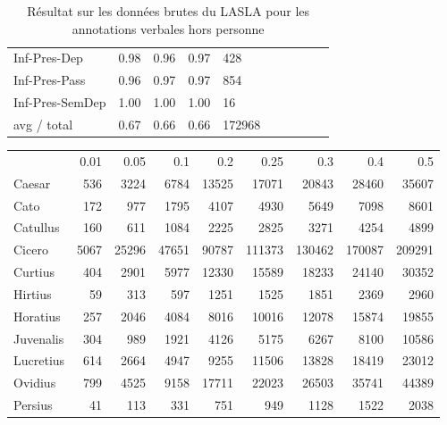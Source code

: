 \begin{table}[h]
{\begin{tabular}{@{}l|llll||l|llll@{}}
 Inf-Pres-Dep      & 0.98      & 0.96   & 0.97     & 428     \\ 
 Inf-Pres-Pass     & 0.96      & 0.97   & 0.97     & 854     \\ 
 Inf-Pres-SemDep   & 1.00      & 1.00   & 1.00     & 16      \\ 
 avg / total       & 0.67      & 0.66   & 0.66     & 172968  \\ \bottomrule
\end{tabular}}
\caption{Résultat sur les données brutes du LASLA pour les annotations verbales hors personne}
\label{table:lasla:verb-scores}
\end{table}


\begin{table}[h]
\begin{tabular}{lrrrrrrrr}
\hline
               &     0.01 &     0.05 &      0.1 &      0.2 &      0.25 &      0.3 &      0.4 &      0.5 \\
 Caesar        &   536    &  3224    &   6784   &  13525   &  17071    &  20843   &  28460   &  35607   \\
 Cato          &   172    &   977    &   1795   &   4107   &   4930    &   5649   &   7098   &   8601   \\
 Catullus      &   160    &   611    &   1084   &   2225   &   2825    &   3271   &   4254   &   4899   \\
 Cicero        &  5067    & 25296    &  47651   &  90787   & 111373    & 130462   & 170087   & 209291   \\
 Curtius       &   404    &  2901    &   5977   &  12330   &  15589    &  18233   &  24140   &  30352   \\
 Hirtius       &    59    &   313    &    597   &   1251   &   1525    &   1851   &   2369   &   2960   \\
 Horatius      &   257    &  2046    &   4084   &   8016   &  10016    &  12078   &  15874   &  19855   \\
 Juvenalis     &   304    &   989    &   1921   &   4126   &   5175    &   6267   &   8100   &  10586   \\
 Lucretius     &   614    &  2664    &   4947   &   9255   &  11506    &  13828   &  18419   &  23012   \\
 Ovidius       &   799    &  4525    &   9158   &  17711   &  22023    &  26503   &  35741   &  44389   \\
 Persius       &    41    &   113    &    331   &    751   &    949    &   1128   &   1522   &   2038   \\

\end{tabular}
\end{table}
